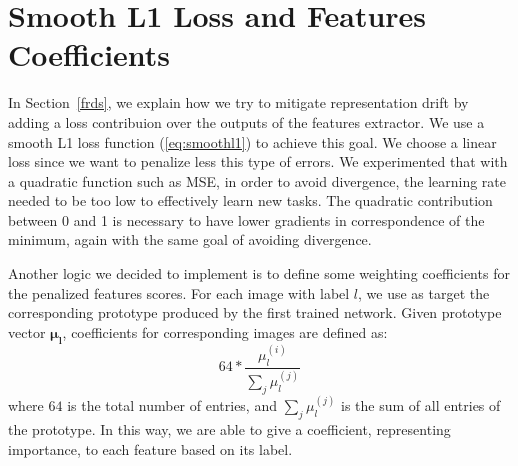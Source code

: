 \documentclass[10pt,twocolumn,letterpaper]{article}
\begin{document}
\appendix
\section{Smooth L1 Loss and Features Coefficients}
\label{appendix}
In Section~\ref{frds}, we explain how we try to mitigate representation drift by adding a loss contribuion over the outputs of the features extractor. We use a smooth L1 loss function (\ref{eq:smoothl1}) to achieve this goal. We choose a linear loss since we want to penalize less this type of errors. We experimented that with a quadratic function such as MSE, in order to avoid divergence, the learning rate needed to be too low to effectively learn new tasks. The quadratic contribution between 0 and 1 is necessary to have lower gradients in  correspondence of the minimum, again with the same goal of avoiding divergence.

Another logic we decided to implement is to define some weighting coefficients for the penalized features scores. For each image with label $l$, we use as target the corresponding prototype produced by the first trained network. Given prototype vector $\bm{\mu_{l}}$, coefficients for corresponding images are defined as:
\begin{equation}
    64 * \frac{\mu_{l}^{(i)}}{\sum_{j} \mu_{l}^{(j)}}
\end{equation}
where $64$ is the total number of entries, and $\sum_{j} \mu_{l}^{(j)}$ is the sum of all entries of the prototype. In this way, we are able to give a coefficient, representing importance, to each feature based on its label.

{\small


}
\end{document}
